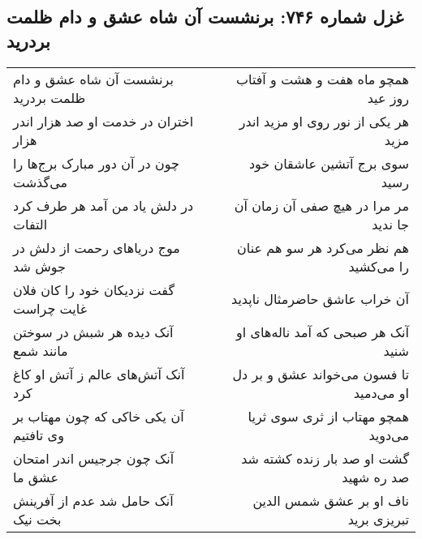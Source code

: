 \begin{center}
\section*{غزل شماره ۷۴۶: برنشست آن شاه عشق و دام ظلمت بردرید}
\label{sec:0746}
\begin{longtable}{l p{0.5cm} r}
برنشست آن شاه عشق و دام ظلمت بردرید
&&
همچو ماه هفت و هشت و آفتاب روز عید
\\
اختران در خدمت او صد هزار اندر هزار
&&
هر یکی از نور روی او مزید اندر مزید
\\
چون در آن دور مبارک برج‌ها را می‌گذشت
&&
سوی برج آتشین عاشقان خود رسید
\\
در دلش یاد من آمد هر طرف کرد التفات
&&
مر مرا در هیچ صفی آن زمان آن جا ندید
\\
موج دریاهای رحمت از دلش در جوش شد
&&
هم نظر می‌کرد هر سو هم عنان را می‌کشید
\\
گفت نزدیکان خود را کان فلان غایت چراست
&&
آن خراب عاشق حاضرمثال ناپدید
\\
آنک دیده هر شبش در سوختن مانند شمع
&&
آنک هر صبحی که آمد ناله‌های او شنید
\\
آنک آتش‌های عالم ز آتش او کاغ کرد
&&
تا فسون می‌خواند عشق و بر دل او می‌دمید
\\
آن یکی خاکی که چون مهتاب بر وی تافتیم
&&
همچو مهتاب از ثری سوی ثریا می‌دوید
\\
آنک چون جرجیس اندر امتحان عشق ما
&&
گشت او صد بار زنده کشته شد صد ره شهید
\\
آنک حامل شد عدم از آفرینش بخت نیک
&&
ناف او بر عشق شمس الدین تبریزی برید
\\
\end{longtable}
\end{center}
